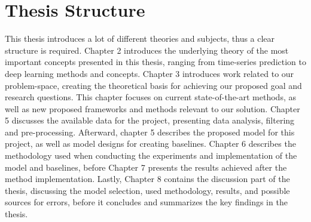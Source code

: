 
\section{Thesis Structure}
\label{sections:Introduction:Structure}

This thesis introduces a lot of different theories and subjects,
thus a clear structure is required.
Chapter 2 introduces the underlying theory of the most important concepts presented in this thesis,
ranging from time-series prediction to deep learning methods and concepts.
Chapter 3 introduces work related to our problem-space, creating the theoretical basis for achieving our proposed goal and research questions.
This chapter focuses on current state-of-the-art methods,
as well as new proposed frameworks and methods relevant to our solution.
Chapter 5 discusses the available data for the project, presenting data analysis, filtering and pre-processing.
Afterward, chapter 5 describes the proposed model for this project, as well as model designs for creating baselines.
Chapter 6 describes the methodology used when conducting the experiments and implementation of the model and baselines,
before Chapter 7 presents the results achieved after the method implementation.
Lastly, Chapter 8 contains the discussion part of the thesis, discussing the model selection, used methodology, results, and possible sources for errors,
before it concludes and summarizes the key findings in the thesis.



\iffalse
  This thesis introduces a lot of different theories and subjects,
  thus a clear structure is required.
  Chapter 2 introduces the underlying theory of the most important concepts presented in this thesis,
  ranging from time-series prediction to deep learning methods and concepts.
  Chapter 3 introduces work related to our problem-space, creating the theoretical basis for achieving our proposed goal and research questions.
  This chapter focuses on current state-of-the-art methods,
  as well as new proposed frameworks and methods relevant to our solution.
  Chapter 4 introduces our proposed method and architecture,
  presenting the model framework and model structure.
  Lastly, chapter 5 supplies an evaluation and discussion of the proposed framework regarding our proposed research questions and goal.
\fi

